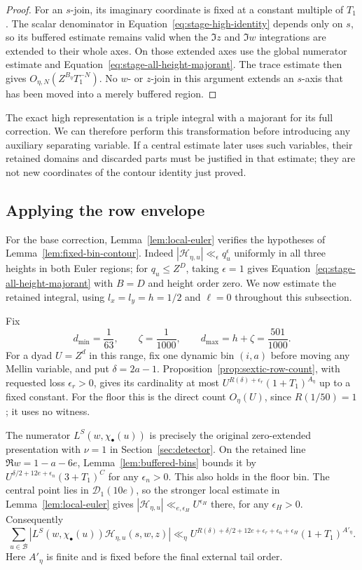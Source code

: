 \documentclass[11pt,a4paper]{article}
\numberwithin{equation}{section}
\numberwithin{figure}{section}
\theoremstyle{definition}
\theoremstyle{remark}
\begin{document}
\begin{proof}
For an $s$-join, its imaginary coordinate is fixed at a constant multiple
of $T_1$.  The scalar denominator in Equation~\eqref{eq:stage-high-identity}
depends only on $s$, so its buffered estimate remains valid when the
$\Im z$ and $\Im w$ integrations are extended to their whole axes.
On those extended axes use the global numerator estimate and
Equation~\eqref{eq:stage-all-height-majorant}.  The trace estimate then gives
$O_{\eta,N}(Z^{B_\eta}T_1^{-N})$.  No $w$- or $z$-join in this argument
extends an $s$-axis that has been moved into a merely buffered region.

\end{proof}

The exact high representation is a triple integral with a majorant for its
full correction.  We can therefore perform this transformation before
introducing any auxiliary separating variable.  If a central estimate later
uses such variables, their retained domains and discarded parts must be
justified in that estimate; they are not new coordinates of the contour
identity just proved.

\subsection{Applying the row envelope}

For the base correction, Lemma~\ref{lem:local-euler} verifies the hypotheses
of Lemma~\ref{lem:fixed-bin-contour}.  Indeed
$|\mathcal H_{\eta,u}|\ll_\epsilon q_u^\epsilon$ uniformly in all three
heights in both Euler regions; for $q_u\le Z^D$, taking $\epsilon=1$ gives
Equation~\eqref{eq:stage-all-height-majorant} with $B=D$ and height order
zero.  We now estimate the retained integral, using
$l_x=l_y=h=1/2$ and $\ell=0$ throughout this subsection.

Fix
\[
 d_{\min}=\frac1{63},\qquad \zeta=\frac1{1000},\qquad
 d_{\max}=h+\zeta=\frac{501}{1000}.
\]
For a dyad $U=Z^d$ in this range, fix one dynamic bin $(i,a)$ before moving
any Mellin variable, and put $\delta=2a-1$.  Proposition~\ref{prop:sextic-row-count}, with requested loss
$\epsilon_r>0$, gives its cardinality at most
$U^{R(\delta)+\epsilon_r}(1+T_1)^{A_\eta}$ up to a fixed constant.
For the floor this is the direct count $O_\eta(U)$, since
$R(1/50)=1$; it uses no witness.

The numerator $L^S(w,\chi_\bullet(u))$ is precisely the original
zero-extended presentation with $\nu=1$ in Section~\ref{sec:detector}.
On the retained line $\Re w=1-a-6e$, Lemma~\ref{lem:buffered-bins} bounds it
by
$U^{\delta/2+12e+\epsilon_n}(3+T_1)^C$ for any $\epsilon_n>0$.
This also holds in the floor bin.  The central point lies in
$\mathcal D_1(10e)$, so the stronger local estimate in
Lemma~\ref{lem:local-euler} gives
$|\mathcal H_{\eta,u}|\ll_{e,\epsilon_H}U^{\epsilon_H}$ there, for any
$\epsilon_H>0$.  Consequently
\[
 \sum_{u\in\mathcal B}
 |L^S(w,\chi_\bullet(u))\mathcal H_{\eta,u}(s,w,z)|
 \ll_\eta
 U^{R(\delta)+\delta/2+12e+\epsilon_r+\epsilon_n+\epsilon_H}
 (1+T_1)^{A'_\eta}.
\]
Here $A'_\eta$ is finite and is fixed before the final external tail order.
\end{document}
